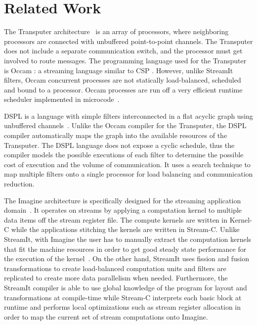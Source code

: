 \newpage
\section{Related Work}
\label{sec:related}

The Transputer architecture~\cite{transputer88} is an array of
processors, where neighboring processors are connected with unbuffered
point-to-point channels.  The Transputer does not include a separate
communication switch, and the processor must get involved to route
messages.  The programming language used for the Transputer is Occam
\cite{occammanual}: a streaming language similar to CSP
\cite{Hoare78}.  However, unlike StreamIt filters, Occam concurrent
processes are not statically load-balanced, scheduled and bound to a
processor. Occam processes are run off a very efficient runtime
scheduler implemented in microcode~\cite{may87communicating}.

DSPL is a language with simple filters interconnected in a flat acyclic
graph using unbuffered channels~\cite{Thiel93}.  Unlike the Occam
compiler for the Transputer, the DSPL compiler automatically maps the
graph into the available resources of the Transputer. The DSPL language
does not expose a cyclic schedule, thus the compiler models the
possible executions of each filter to determine the possible cost of
execution and the volume of communication. It uses a search technique
to map multiple filters onto a single processor for load balancing and
communication reduction. 

The Imagine architecture is specifically designed for the streaming
application domain~\cite{rixner98bandwidthefficient}.  It operates on
streams by applying a computation kernel to multiple data items off
the stream register file.  The compute kernels are written in Kernel-C
while the applications stitching the kernels are written in Stream-C.
Unlike StreamIt, with Imagine the user has to manually extract the
computation kernels that fit the machine resources in order to get
good steady state performance for the execution of the
kernel~\cite{kapasi:2001:ss}.  On the other hand, StreamIt uses
fission and fusion transformations to create load-balanced computation
units and filters are replicated to create more data parallelism when
needed.  Furthermore, the StreamIt compiler is able to use global
knowledge of the program for layout and transformations at
compile-time while Stream-C interprets each basic block at runtime and
performs local optimizations such as stream register allocation in
order to map the current set of stream computations onto Imagine.

